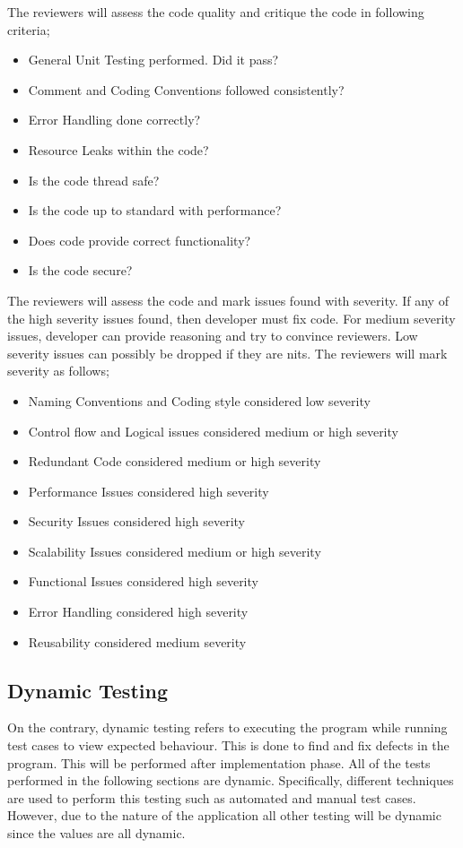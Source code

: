 \documentclass[12pt]{article}
\begin{document}
The reviewers will assess the code quality and critique the code in following criteria;\\
\begin{itemize}
 \item General Unit Testing performed. Did it pass?
 \item Comment and Coding Conventions followed consistently?
 \item Error Handling done correctly?
 \item Resource Leaks within the code?
 \item Is the code thread safe?
 \item Is the code up to standard with performance?
 \item Does code provide correct functionality?
 \item Is the code secure?
 \end{itemize}
The reviewers will assess the code and mark issues found with severity. If any of the high severity issues found, then developer must fix code. For medium severity issues, developer can provide reasoning and try to convince reviewers. Low severity issues can possibly be dropped if they are nits. The reviewers will mark severity as follows;
\begin{itemize}
\item Naming Conventions and Coding style considered low severity
\item Control flow and Logical issues considered medium or high severity
\item Redundant Code considered medium or high severity
\item Performance Issues considered high severity
\item Security Issues considered high severity
\item Scalability Issues considered medium or high severity
\item Functional Issues considered high severity
\item Error Handling considered high severity
\item Reusability considered medium severity
\end{itemize}

\subsection{Dynamic Testing}
On the contrary, dynamic testing refers to executing the program while running test cases to view expected behaviour. This is done to find and fix defects in the program. This will be performed after implementation phase. All of the tests performed in the following sections are dynamic. Specifically, different techniques are used to perform this testing such as automated and manual test cases. However, due to the nature of the application all other testing will be dynamic since the values are all dynamic.
\end{document}
